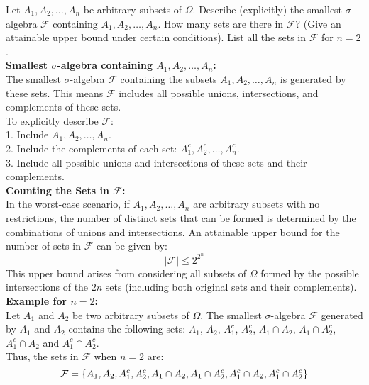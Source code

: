 \begin{example}
    Let \( A_1, A_2, \ldots, A_n \) be arbitrary subsets of \( \Omega \). Describe (explicitly) the smallest \(\sigma\)-algebra \( \mathcal{F} \) containing \( A_1, A_2, \ldots, A_n \). How many sets are there in \( \mathcal{F} \)? (Give an attainable upper bound under certain conditions). List all the sets in \( \mathcal{F} \) for \( n = 2 \).\\

    \textbf{Smallest \(\sigma\)-algebra containing \( A_1, A_2, \ldots, A_n \):}  \\

The smallest \(\sigma\)-algebra \( \mathcal{F} \) containing the subsets \( A_1, A_2, \ldots, A_n \) is generated by these sets. This means \( \mathcal{F} \) includes all possible unions, intersections, and complements of these sets.\\

To explicitly describe \( \mathcal{F} \):\\
1. Include \( A_1, A_2, \ldots, A_n \).\\
2. Include the complements of each set: \( A_1^c, A_2^c, \ldots, A_n^c \).\\
3. Include all possible unions and intersections of these sets and their complements.\\

\textbf{Counting the Sets in \( \mathcal{F} \):}  \\

In the worst-case scenario, if \( A_1, A_2, \ldots, A_n \) are arbitrary subsets with no restrictions, the number of distinct sets that can be formed is determined by the combinations of unions and intersections. An attainable upper bound for the number of sets in \( \mathcal{F} \) can be given by:
\[
|\mathcal{F}| \leq 2^{2^n}
\]
This upper bound arises from considering all subsets of \( \Omega \) formed by the possible intersections of the \( 2n \) sets (including both original sets and their complements).\\

\textbf{Example for \( n = 2 \):} \\

Let \( A_1 \) and \( A_2 \) be two arbitrary subsets of \( \Omega \). The smallest \(\sigma\)-algebra \( \mathcal{F} \) generated by \( A_1 \) and \( A_2 \) contains the following sets: \( A_1 \), \( A_2 \), \( A_1^c \), \( A_2^c \), \( A_1 \cap A_2 \), \( A_1 \cap A_2^c \), \( A_1^c \cap A_2 \) and \( A_1^c \cap A_2^c \).\\

Thus, the sets in \( \mathcal{F} \) when \( n = 2 \) are:
\[
\mathcal{F} = \{ A_1, A_2, A_1^c, A_2^c, A_1 \cap A_2, A_1 \cap A_2^c, A_1^c \cap A_2, A_1^c \cap A_2^c \}\\
\]
\end{example}

